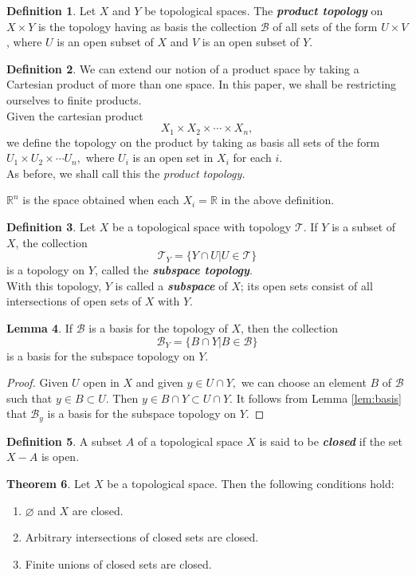 \documentclass{article}
\theoremstyle{definition}
\newtheorem{theorem}{Theorem}[section]
\newtheorem{lem}[theorem]{Lemma}
\newtheorem{defn}[theorem]{Definition}
\let\emptyset\varnothing
\begin{document}
\begin{defn} 
  Let $X$ and $Y$ be topological spaces. The \textbf{\emph{product topology}} on $X\times Y$ is the topology having as basis the collection $\mathcal{B}$ of all sets of the form $U\times V$, where $U$ is an open subset of $X$ and $V$ is an open subset of $Y.$
\end{defn}
%
\begin{defn}
  We can extend our notion of a product space by taking a Cartesian product of more than one space. In this paper, we shall be restricting ourselves to finite products.\\
  Given the cartesian product
  \[X_1 \times X_2 \times \cdots \times X_n,\]
  we define the topology on the product by taking as basis all sets of the form $U_1 \times U_2 \times \cdots U_n,$ where $U_i$ is an open set in $X_i$ for each $i.$\\
  As before, we shall call this the \emph{product topology.}
\end{defn}
$\mathbb{R}^n$ is the space obtained when each $X_i = \mathbb{R}$ in the above definition.
%
\begin{defn} 
  Let $X$ be a topological space with topology $\mathcal{T}.$ If $Y$ is a subset of $X$, the collection
  \[\mathcal{T}_Y = \{Y\cap U|U\in\mathcal{T}\}\]
  is a topology on $Y$, called the \textbf{\emph{subspace topology}}.\\
  With this topology, $Y$ is called a \textbf{\emph{subspace}} of $X$; its open sets consist of all intersections of open sets of $X$ with $Y.$
\end{defn}
%
\begin{lem} 
  If $\mathcal{B}$ is a basis for the topology of $X$, then the collection
  \[\mathcal{B}_Y = \{B\cap Y|B\in\mathcal{B}\}\]
  is a basis for the subspace topology on $Y.$
\end{lem}
\begin{proof}
  Given $U$ open in $X$ and given $y \in U \cap Y,$ we can choose an element $B$ of $\mathcal{B}$ such that $y \in B \subset U.$ Then $y \in B \cap Y \subset U \cap Y.$ It follows from Lemma \ref{lem:basis} that $\mathcal{B}_y$ is a basis for the subspace topology on $Y.$
\end{proof}
%
\begin{defn} 
  A subset $A$ of a topological space $X$ is said to be \textbf{\emph{closed}} if the set $X-A$ is open.
\end{defn}
\begin{theorem} 
  Let $X$ be a topological space. Then the following conditions hold:
  \begin{enumerate}[nosep] 
    \item $\emptyset$ and $X$ are closed.
    \item Arbitrary intersections of closed sets are closed.
    \item Finite unions of closed sets are closed.
  \end{enumerate}
\end{theorem}
\end{document}
